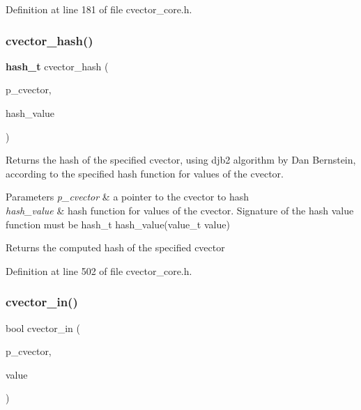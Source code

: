 Definition at line 181 of file cvector\+\_\+core.\+h.

\mbox{\label{cvector__core_8h_ae5ad5e4e2a0c41c165d3ad1f933916e7}} 
\subsubsection{cvector\+\_\+hash()}
{\footnotesize\ttfamily \textbf{ hash\+\_\+t} cvector\+\_\+hash (\begin{DoxyParamCaption}\item[{\textbf{ cvector} $\ast$}]{p\+\_\+cvector,  }\item[{\textbf{ hash\+\_\+t}($\ast$)(\textbf{ value\+\_\+t})}]{hash\+\_\+value }\end{DoxyParamCaption})}

Returns the hash of the specified cvector, using djb2 algorithm by Dan Bernstein, according to the specified hash function for values of the cvector. 
\begin{DoxyParams}{Parameters}
{\em p\+\_\+cvector} & a pointer to the cvector to hash \\
\hline
{\em hash\+\_\+value} & hash function for values of the cvector. Signature of the hash value function must be hash\+\_\+t hash\+\_\+value(value\+\_\+t value) \\
\hline
\end{DoxyParams}
\begin{DoxyReturn}{Returns}
the computed hash of the specified cvector 
\end{DoxyReturn}


Definition at line 502 of file cvector\+\_\+core.\+h.

\mbox{\label{cvector__core_8h_a8729382aeac08507d1e6450a23060aa6}} 
\subsubsection{cvector\+\_\+in()}
{\footnotesize\ttfamily bool cvector\+\_\+in (\begin{DoxyParamCaption}\item[{\textbf{ cvector} $\ast$}]{p\+\_\+cvector,  }\item[{\textbf{ value\+\_\+t}}]{value }\end{DoxyParamCaption})}

